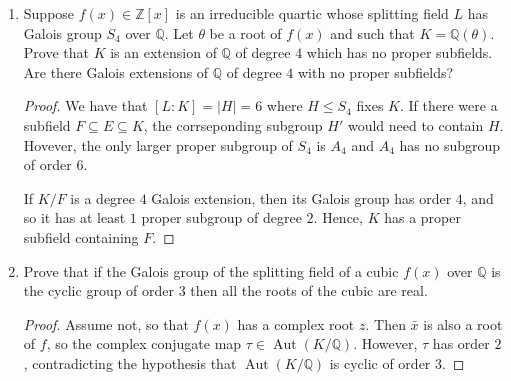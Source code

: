 \documentclass{report}
\newcommand{\Z}{\mathbb{Z}}
\newcommand{\Q}{\mathbb{Q}}
\DeclareMathOperator{\Aut}{Aut}
\begin{document}
\begin{enumerate}
		Show there are Galois extensions of $F$ contained in $K $ of degrees $p$ and $p^{n-1}$.
		\begin{proof}
			Let $G=\Aut(K / F)$, so that $|G|=p^n$. Recall that a group of order $p^n$ has a normal subgroup of order $p^k$ for all $0\leq k\leq n$.
			In particular, there is a normal subgroup $H$ of order $p$ and another,  $I$ of order $p^{n-1}$.
			From the fundamental theorem of Galois theory, there are fields $L$ and $J$ such that $F\subseteq L\subseteq K$ and $F\subseteq J\subseteq K$
			with $\Aut(K / L)=H$ and $\Aut (K / J)= I$. Moreover, $L$ and $J$ are Galois over $F$, since $H$ and $I$ are normal in $G$.
		\end{proof}
		\setcounter{enumi}{10}
	\item Suppose $f(x)\in\Z[x]$ is an irreducible quartic whose splitting field $L$ has Galois group $S_4$ over $\Q$.
		Let $\theta$ be a root of $f(x)$ and such that $K=\Q(\theta)$. Prove that $K$ is an extension of $\Q$ of degree $4$ which has no proper subfields.
		Are there Galois extensions of $\Q$ of degree $4$ with no proper subfields?
		\begin{proof}
			We have that $[L:K]=|H|=6$ where $H\leq S_4$ fixes $K$. If there were a subfield $F\subseteq E \subseteq K$, the corrseponding subgroup $H'$
			would need to contain $H$. Hovever, the only larger proper subgroup of $S_4$ is $A_4$ and $A_4$ has no subgroup of order $6$.
			\newline

			If $K / F$ is a degree $4$ Galois extension, then its Galois group has order $4$, and so it has at least $1$ proper subgroup of degree $2$.
			Hence, $K$ has a proper subfield containing $F$.
		\end{proof}
		
		\setcounter{enumi}{12}
	\item Prove that if the Galois group of the splitting field of a cubic $f(x)$ over $\Q$ is the cyclic group of order $3$ then all the roots of the cubic are real.
		\begin{proof}
			Assume not, so that $f(x)$ has a complex root $z$. Then $\bar{x}$ is also a root of $f$, so the complex conjugate map $\tau\in\Aut(K / \Q)$.
			However, $\tau$ has order $2$, contradicting the hypothesis that $\Aut(K / \Q)$ is cyclic of order $3$.
		\end{proof}
		
\end{enumerate}
\end{document}
